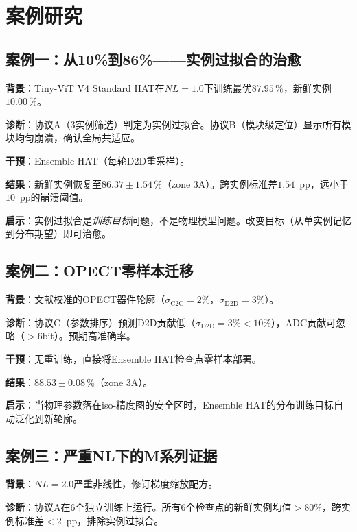 \section{案例研究}
\label{sec:failure_case_studies}

\subsection{案例一：从10\%到86\%——实例过拟合的治愈}
\label{subsec:case_instance_overfitting}

\textbf{背景}：Tiny-ViT V4 Standard HAT在$NL=1.0$下训练最优$87.95\,\%$，新鲜实例$10.00\,\%$。

\textbf{诊断}：协议A（3实例筛选）判定为实例过拟合。协议B（模块级定位）显示所有模块均匀崩溃，确认全局共适应。

\textbf{干预}：Ensemble HAT（每轮D2D重采样）。

\textbf{结果}：新鲜实例恢复至$86.37\pm1.54\,\%$（zone 3A）。跨实例标准差$1.54$~pp，远小于$10$~pp的崩溃阈值。

\textbf{启示}：实例过拟合是\emph{训练目标}问题，不是物理模型问题。改变目标（从单实例记忆到分布期望）即可治愈。

\subsection{案例二：OPECT零样本迁移}
\label{subsec:case_opect}

\textbf{背景}：文献校准的OPECT器件轮廓（$\sigma_{\mathrm{C2C}}=2\%$，$\sigma_{\mathrm{D2D}}=3\%$）。

\textbf{诊断}：协议C（参数排序）预测D2D贡献低（$\sigma_{\mathrm{D2D}}=3\%<10\%$），ADC贡献可忽略（$>$6bit）。预期高准确率。

\textbf{干预}：无重训练，直接将Ensemble HAT检查点零样本部署。

\textbf{结果}：$88.53\pm0.08\,\%$（zone 3A）。

\textbf{启示}：当物理参数落在iso-精度图的安全区时，Ensemble HAT的分布训练目标自动泛化到新轮廓。

\subsection{案例三：严重NL下的M系列证据}
\label{subsec:case_m_series}

\textbf{背景}：$NL=2.0$严重非线性，修订梯度缩放配方。

\textbf{诊断}：协议A在6个独立训练上运行。所有6个检查点的新鲜实例均值$>$80\%，跨实例标准差$<$2~pp，排除实例过拟合。

